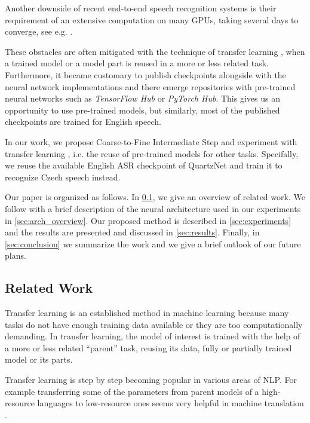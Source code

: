 Another downside of recent end-to-end speech recognition systems is their requirement of an extensive computation on many GPUs, taking several days to converge, see e.g. . 

These obstacles  are often mitigated with the technique of transfer learning , when a trained model or a model part is reused in a more or less related task.
Furthermore, it became customary to publish checkpoints alongside with the neural network implementations and 
there emerge repositories with pre-trained neural networks such as \textit{TensorFlow Hub} or \textit{PyTorch
Hub}. This gives us an opportunity to use pre-trained models, but similarly, most of the published checkpoints are trained for English speech.

In our work, we propose Coarse-to-Fine Intermediate Step and experiment with transfer learning , i.e. the reuse of pre-trained models for other tasks. Specifally,
we reuse the available English ASR checkpoint of QuartzNet  and train it to recognize Czech speech instead.

Our paper is organized as follows. In \cref{asr:related_work}, we give an overview of related work. We follow with a brief description of the neural architecture used in our experiments in \cref{sec:arch_overview}.
Our proposed method is described in \cref{sec:experiments} and the results are presented and discussed in \cref{sec:results}.
Finally, in \cref{sec:conclusion} we summarize the work and we give a brief outlook of our future plans.


\subsection{Related Work}
\label{asr:related_work}

Transfer learning  is an established method in machine learning because many tasks do not have enough training data available or they are too computationally demanding. In transfer learning, the model of interest is trained with the help of a more or less related ``parent'' task, reusing its data, fully or partially trained model or its parts.

Transfer learning is step by step becoming popular in various areas of NLP. 
For example transferring some of the parameters from parent models of a high-resource languages to low-resource ones seems very helpful in machine translation .

